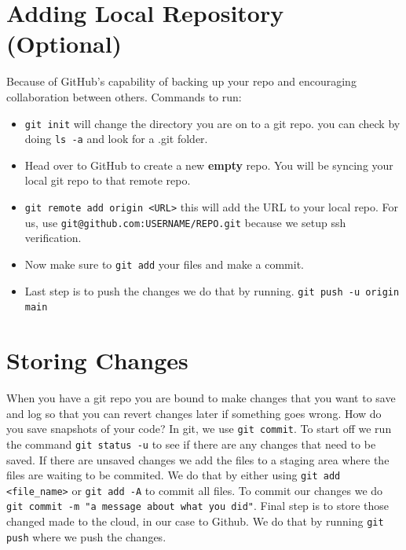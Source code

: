 \documentclass[12pt, a4paper]{article}
\begin{document}
\section{Adding Local Repository (Optional)}
Because of GitHub's capability of backing up your repo and encouraging collaboration between others. Commands to run:
\begin{itemize}
    \item \verb`git init` will change the directory you are on to a git repo. you can check by doing \verb`ls -a` and look for a .git folder.
    \item Head over to GitHub to create a new \textbf{empty} repo. You will be syncing your local git repo to that remote repo.
    \item \verb`git remote add origin <URL>` this will add the URL to your local repo. For us, use \verb`git@github.com:USERNAME/REPO.git` because we setup ssh verification.
    \item Now make sure to \verb`git add` your files and make a commit.
    \item Last step is to push the changes we do that by running. \verb`git push -u origin main`
\end{itemize}

\section{Storing Changes}

When you have a git repo you are bound to make changes that you want to save and log so that you can revert changes later if something goes wrong. How do you save snapshots of your code? In git, we use \texttt{git commit}. To start off we run the command \texttt{git status -u} to see if there are any changes that need to be saved. If there are unsaved changes we add the files to a staging area where the files are waiting to be commited. We do that by either using \texttt{git add <file\_name>} or \texttt{git add -A} to commit all files. To commit our changes we do \texttt{git commit -m "a message about what you did"}. Final step is to store those changed made to the cloud, in our case to Github. We do that by running \texttt{git push} where we push the changes.\\
\end{document}
